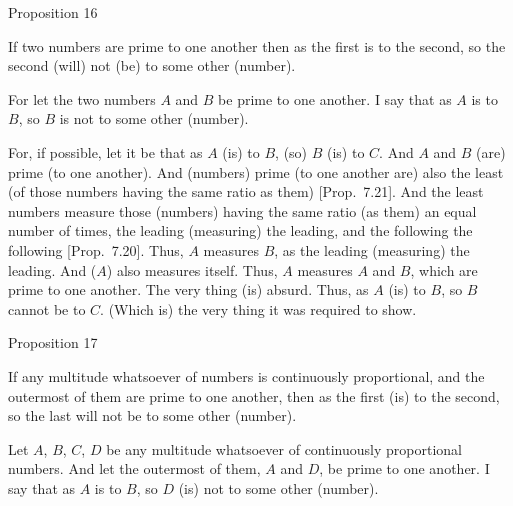 
\begin{center}
{\large Proposition 16}
\end{center}

If two numbers are prime to one another then as the
first is to the second, so the second (will) not (be) to some other (number).

\epsfysize=0.9in
\centerline{}

For let the two numbers $A$ and $B$ be prime to one another. I say that
as $A$ is to $B$, so $B$ is not to some other (number).

For, if possible, let it be that as $A$ (is) to $B$, (so) $B$ (is) to $C$. And $A$ and $B$
(are) prime (to one another). And (numbers) prime (to one another are)
also the least (of those numbers having the same ratio as them) [Prop.~7.21]. And the least numbers measure those
(numbers) having the same ratio (as them) an equal number of times,
the leading (measuring) the leading, and the following the following [Prop.~7.20]. Thus, $A$ measures $B$, 
as the leading (measuring) the leading. And ($A$) also measures itself.
Thus, $A$ measures $A$ and $B$, which are prime to one another. The very
thing (is) absurd. Thus, as $A$  (is) to $B$, so $B$ cannot be to $C$.
(Which is) the very thing it was required to show.


\begin{center}
{\large Proposition 17}
\end{center}

If   any multitude whatsoever of numbers is continuously proportional, and the outermost of them are prime to one another, then as the first (is) to the second, so the last will not be
to some other (number).

Let $A$, $B$, $C$, $D$ be any multitude whatsoever of continuously
proportional numbers. And let the outermost of them, $A$ and $D$,
be prime to one another. I say that as $A$ is to $B$, so $D$ (is) not to some
other (number).

\epsfysize=1.3in
\centerline{}

